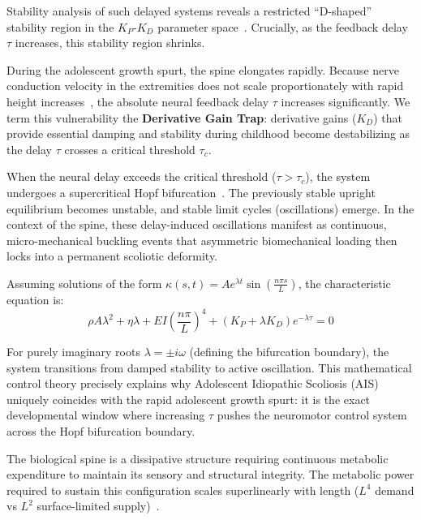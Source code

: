 \documentclass[11pt]{article}
\begin{document}
Stability analysis of such delayed systems reveals a restricted ``D-shaped'' stability region in the $K_P$-$K_D$ parameter space~\cite{peterka2002sensorimotor, masani2006controlling}. Crucially, as the feedback delay $\tau$ increases, this stability region shrinks.

During the adolescent growth spurt, the spine elongates rapidly. Because nerve conduction velocity in the extremities does not scale proportionately with rapid height increases~\cite{lang1985nerve, robinson2001nerve}, the absolute neural feedback delay $\tau$ increases significantly. We term this vulnerability the \textbf{Derivative Gain Trap}: derivative gains ($K_D$) that provide essential damping and stability during childhood become destabilizing as the delay $\tau$ crosses a critical threshold $\tau_c$.

When the neural delay exceeds the critical threshold ($\tau > \tau_c$), the system undergoes a supercritical Hopf bifurcation~\cite{landry2005dynamics}. The previously stable upright equilibrium becomes unstable, and stable limit cycles (oscillations) emerge. In the context of the spine, these delay-induced oscillations manifest as continuous, micro-mechanical buckling events that asymmetric biomechanical loading then locks into a permanent scoliotic deformity.

Assuming solutions of the form $\kappa(s,t) = A e^{\lambda t} \sin\left(\frac{n\pi s}{L}\right)$, the characteristic equation is:
\begin{equation}
\rho A \lambda^2 + \eta \lambda + EI \left(\frac{n\pi}{L}\right)^4 + (K_P + \lambda K_D) e^{-\lambda \tau} = 0
\label{eq:characteristic_dde}
\end{equation}

For purely imaginary roots $\lambda = \pm i\omega$ (defining the bifurcation boundary), the system transitions from damped stability to active oscillation. This mathematical control theory precisely explains why Adolescent Idiopathic Scoliosis (AIS) uniquely coincides with the rapid adolescent growth spurt: it is the exact developmental window where increasing $\tau$ pushes the neuromotor control system across the Hopf bifurcation boundary.

The biological spine is a dissipative structure requiring continuous metabolic expenditure to maintain its sensory and structural integrity. The metabolic power required to sustain this configuration scales superlinearly with length ($L^4$ demand vs $L^2$ surface-limited supply)~\cite{sato2025convective}.
\end{document}
